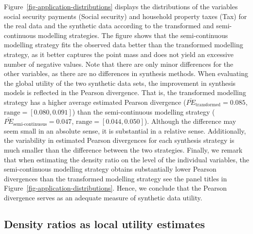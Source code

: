 \documentclass[
]{article}
\begin{document}
Figure~\ref{fig-application-distributions} displays the distributions of
the variables social security payments (Social security) and household
property taxes (Tax) for the real data and the synthetic data according
to the transformed and semi-continuous modelling strategies. The figure
shows that the semi-continuous modelling strategy fits the observed data
better than the transformed modelling strategy, as it better captures
the point mass and does not yield an excessive number of negative
values. Note that there are only minor differences for the other
variables, as there are no differences in synthesis methods. When
evaluating the global utility of the two synthetic data sets, the
improvement in synthesis models is reflected in the Pearson divergence.
That is, the transformed modelling strategy has a higher average
estimated Pearson divergence (\(\bar{PE}_\text{transformed} = 0.085\),
\(\text{range} = [0.080, 0.091]\)) than the semi-continuous modelling
strategy (\(\bar{PE}_\text{semi-continuous} = 0.047\),
\(\text{range} = [0.044, 0.050]\)). Although the difference may seem
small in an absolute sense, it is substantial in a relative sense.
Additionally, the variability in estimated Pearson divergences for each
synthesis strategy is much smaller than the difference between the two
strategies. Finally, we remark that when estimating the density ratio on
the level of the individual variables, the semi-continuous modelling
strategy obtains substantially lower Pearson divergences than the
transformed modelling strategy see the panel titles in
Figure~\ref{fig-application-distributions}. Hence, we conclude that the
Pearson divergence serves as an adequate measure of synthetic data
utility.

\subsection{Density ratios as local utility
estimates}\label{density-ratios-as-local-utility-estimates}

\linespread{1}
\end{document}
